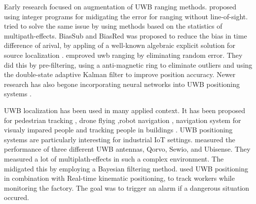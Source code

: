 Early research focused on augmentation of UWB ranging methods.
\cite{venkatesh2007nlos} proposed using integer programs for midigating the error for ranging without line-of-sight.
\cite{guvencc2007nlos} tried to solve the same issue by using methods based on the statistics of multipath-effects.
BiasSub and BiasRed was proposed to reduce the bias in time difference of arival, by appling of a well-known algebraic explicit solution for source localization  \cite{ho2012bias}.
\cite{fan2017performance} emproved uwb ranging by eliminating random error. They did this by pre-filtering, using a anti-magnetic ring to eliminate outliers and using the double-state adaptive Kalman filter to improve position accuracy.
Newer research has also begone incorporating neural networks into UWB positioning systems \cite{stahlke2020nlos, ridolfi2021uwb, che2020machine}.

UWB localization has been used in many applied context.
It has been proposed for pedestrian tracking \cite{otim2019effects}, drone flying \cite{macoir2019uwb},robot navigation \cite{zhu2020adapted}, navigation system for visualy impared people \cite{rosiak2024effectiveness} and tracking people in buildings \cite{elbaum2024investigating}.
UWB positioning systems are particularly interesting for industrial IoT settings.
\cite{barbieri2021uwb} measured the performance of three different UWB antennas, Qorvo, Sewio, and Ubisense. They measured a lot of multiplath-effects in such a complex environment. The midigated this by employing a Bayesian filtering method.
\cite{belli2024cloud} used UWB positioning in combination with Real-time kinematic positioning, to track workers while monitoring the factory. The goal was to trigger an alarm if a dangerous situation occured.
